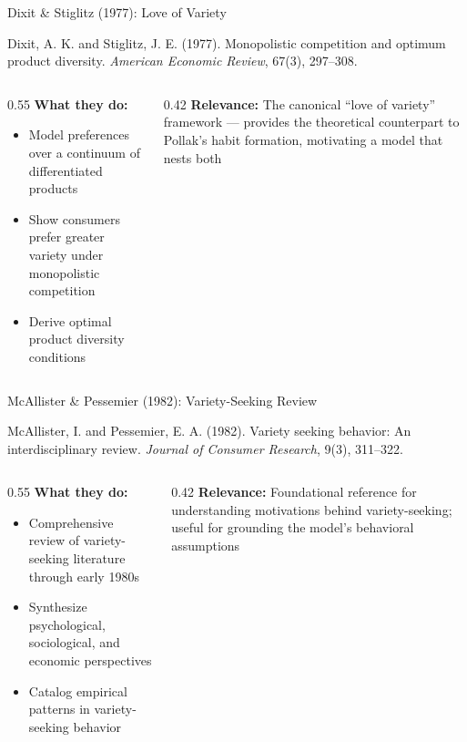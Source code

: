 \documentclass[aspectratio=169,professionalfonts]{beamer}
\newcommand{\hl}[1]{\textbf{\textcolor{UGARed}{#1}}}
\begin{document}
\begin{frame}{Dixit \& Stiglitz (1977): Love of Variety}
  \begin{tcolorbox}[colback=red!5!white, colframe=UGARed, title=\textbf{Citation}]
    Dixit, A. K. and Stiglitz, J. E. (1977). Monopolistic competition and optimum
    product diversity. \textit{American Economic Review}, 67(3), 297--308.
  \end{tcolorbox}
  \vspace{6pt}
  \begin{columns}[T]
    \begin{column}{0.55\textwidth}
      \hl{What they do:}
      \begin{itemize}
        \item Model preferences over a continuum of differentiated products
        \item Show consumers prefer greater variety under monopolistic competition
        \item Derive optimal product diversity conditions
      \end{itemize}
    \end{column}
    \begin{column}{0.42\textwidth}
      \hl{Relevance:} The canonical ``love of variety'' framework --- provides the theoretical
      counterpart to Pollak's habit formation, motivating a model that nests both
    \end{column}
  \end{columns}
\end{frame}

\begin{frame}{McAllister \& Pessemier (1982): Variety-Seeking Review}
  \begin{tcolorbox}[colback=red!5!white, colframe=UGARed, title=\textbf{Citation}]
    McAllister, I. and Pessemier, E. A. (1982). Variety seeking behavior: An
    interdisciplinary review. \textit{Journal of Consumer Research}, 9(3), 311--322.
  \end{tcolorbox}
  \vspace{6pt}
  \begin{columns}[T]
    \begin{column}{0.55\textwidth}
      \hl{What they do:}
      \begin{itemize}
        \item Comprehensive review of variety-seeking literature through early 1980s
        \item Synthesize psychological, sociological, and economic perspectives
        \item Catalog empirical patterns in variety-seeking behavior
      \end{itemize}
    \end{column}
    \begin{column}{0.42\textwidth}
      \hl{Relevance:} Foundational reference for understanding motivations behind
      variety-seeking; useful for grounding the model's behavioral assumptions
    \end{column}
  \end{columns}
\end{frame}
\end{document}

